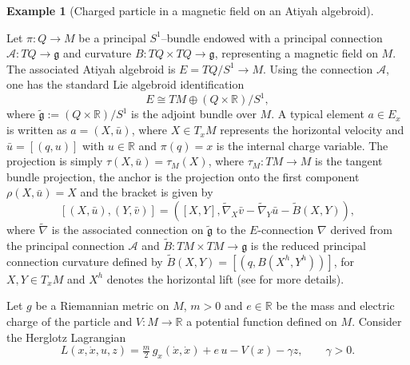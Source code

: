 \documentclass[11pt,a4paper]{article}
\theoremstyle{definition}
\newtheorem{example}[theorem]{Example}
\begin{document}
\begin{example}[Charged particle in a magnetic field on an Atiyah algebroid]
\label{ex:magnetic_Herglotz_Atiyah}

Let $\pi:Q\to M$ be a principal $S^1$--bundle endowed with a principal
connection $\mathcal A:TQ \to \mathfrak{g}$ and curvature $B:TQ\times TQ \to \mathfrak{g}$,
representing a magnetic field on $M$.
The associated Atiyah algebroid is $E=TQ/S^1\to M$. Using the connection $\mathcal A$, one has the standard Lie algebroid identification
\[
E \cong TM \oplus (Q\times\mathbb R)/S^1,
\]
where $\tilde{\mathfrak{g}}:=(Q\times\mathbb R)/S^1$ is the adjoint bundle over $M$. A typical element $a\in E_x$ is written as $a=(X,\bar{u})$, where $X\in T_xM$ represents the horizontal velocity and $\bar{u}=[(q,u)]$ with $u\in\mathbb R$ and $\pi(q)=x$ is the internal charge variable. The projection is simply $\tau(X,\bar{u})=\tau_M(X)$, where $\tau_M:TM\to M$ is the tangent bundle projection, the anchor is the projection onto the first component $\rho(X,\bar{u})=X$ and the bracket is given by
$$[(X,\bar{u}), (Y,\bar{v})]=\left( [X,Y], \tilde{\nabla}_X \bar{v} - \tilde{\nabla}_Y \bar{u} - \tilde{B}(X,Y)\right),$$
where $\tilde{\nabla}$ is the associated connection on $\tilde{\mathfrak{g}}$ to the $E$-connection $\nabla$ derived from the principal connection $\mathcal{A}$ and $\tilde{B}:TM\times TM\to \mathfrak{g}$ is the reduced principal connection curvature defined by $\tilde{B}(X,Y)=[(q, B(X^{h}, Y^{h}))]$, for $X,Y\in T_xM$ and $X^{h}$ denotes the horizontal lift (see \cite{cendra2001lagrangian} for more details).



Let $g$ be a Riemannian metric on $M$, $m>0$ and $e\in\mathbb R$ be the mass and electric charge of the particle and $V:M\to\mathbb{R}$ a potential function defined on $M$.
Consider the Herglotz Lagrangian
\[
L(x,\dot{x},u,z)
=\tfrac m2\,g_x(\dot{x},\dot{x})+e\,u -V(x)-\gamma z,
\qquad \gamma>0.
\]


\end{example}
\end{document}

